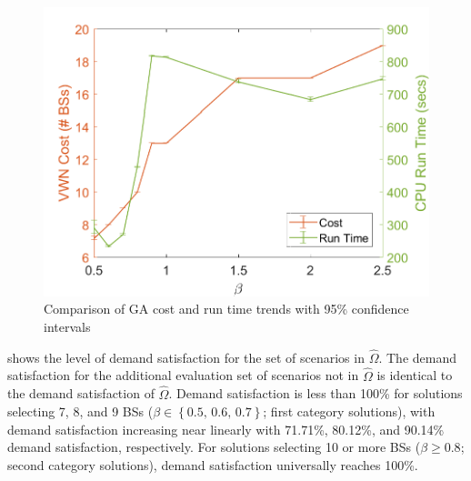 \documentclass[12pt,dvipsnames]{report}
\begin{document}
\begin{figure}[htp]
	\centering
	\includegraphics[height=0.4\textheight]{Figures/CaseI_GAComparisonCostRuntime}
	\caption[Comparison of Case I GA approach cost and run time]{Comparison of GA cost and run time trends with 95\% confidence intervals}
	\label{fig:CaseI_GAComparisonCostRunTime}
\end{figure}

 shows the level of demand satisfaction for the set of scenarios in $\hat{\Omega}$.  The demand satisfaction for the additional evaluation set of scenarios not in $\hat{\Omega}$ is identical to the demand satisfaction of $\hat{\Omega}$.  Demand satisfaction is less than 100\% for solutions selecting 7, 8, and 9 BSs ($\beta \in \left\{ 0.5,\, 0.6,\, 0.7 \right\}$; first category solutions), with demand satisfaction increasing near linearly with 71.71\%, 80.12\%, and 90.14\% demand satisfaction, respectively.  For solutions selecting 10 or more BSs ($\beta \geq 0.8$; second category solutions), demand satisfaction universally reaches 100\%.
\end{document}
